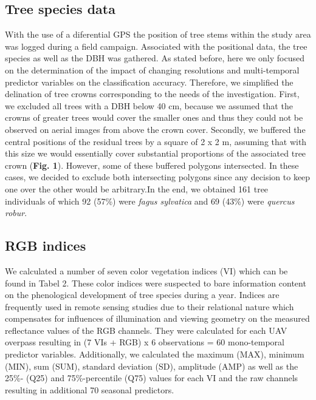 \documentclass[]{article}
\begin{document}
\hypertarget{tree-species-data}{%
\subsection{Tree species data}\label{tree-species-data}}

With the use of a diferential GPS the position of tree stems within the
study area was logged during a field campaign. Associated with the
positional data, the tree species as well as the DBH was gathered. As
stated before, here we only focused on the determination of the impact
of changing resolutions and multi-temporal predictor variables on the
classification accuracy. Therefore, we simplified the delination of tree
crowns corresponding to the needs of the investigation. First, we
excluded all trees with a DBH below 40 cm, because we assumed that the
crowns of greater trees would cover the smaller ones and thus they could
not be observed on aerial images from above the crown cover. Secondly,
we buffered the central positions of the residual trees by a square of 2
x 2 m, assuming that with this size we would essentially cover
substantial proportions of the associated tree crown (\textbf{Fig. 1}).
However, some of these buffered polygons intersected. In these cases, we
decided to exclude both intersecting polygons since any decision to keep
one over the other would be arbitrary.In the end, we obtained 161 tree
individuals of which 92 (57\%) were \emph{fagus sylvatica} and 69 (43\%)
were \emph{quercus robur}.

\hypertarget{rgb-indices}{%
\subsection{RGB indices}\label{rgb-indices}}

We calculated a number of seven color vegetation indices (VI) which can
be found in Tabel 2. These color indices were suspected to bare
information content on the phenological development of tree species
during a year. Indices are frequently used in remote sensing studies due
to their relational nature which compensates for influences of
illumination and viewing geometry on the measured reflectance values of
the RGB channels. They were calculated for each UAV overpass resulting
in (7 VIs + RGB) x 6 observations = 60 mono-temporal predictor
variables. Additionally, we calculated the maximum (MAX), minimum (MIN),
sum (SUM), standard deviation (SD), amplitude (AMP) as well as the 25\%-
(Q25) and 75\%-percentile (Q75) values for each VI and the raw channels
resulting in additional 70 seasonal predictors.
\end{document}
